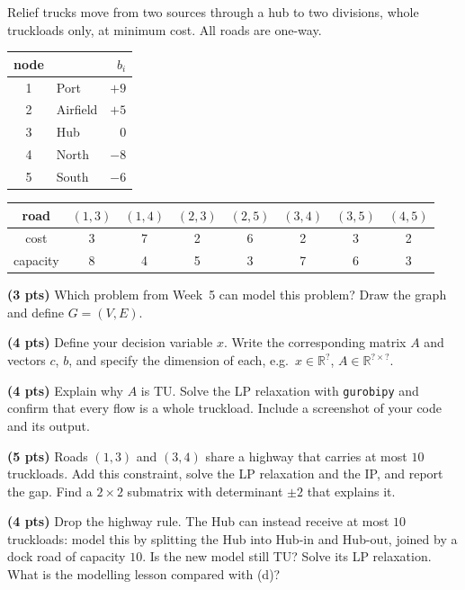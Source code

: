 \documentclass[10pt]{article}
\begin{document}
Relief trucks move from two sources through a hub to two divisions, whole truckloads
only, at minimum cost. All roads are one-way.
\begin{center}
\begin{tabular}[t]{c|l|r}
 node & & $b_i$ \\ \hline
 1 & Port     & $+9$ \\
 2 & Airfield & $+5$ \\
 3 & Hub      & $0$ \\
 4 & North    & $-8$ \\
 5 & South    & $-6$ \\
\end{tabular}
\qquad
\begin{tabular}[t]{c|ccccccc}
 road      & $(1,3)$ & $(1,4)$ & $(2,3)$ & $(2,5)$ & $(3,4)$ & $(3,5)$ & $(4,5)$ \\ \hline
 cost      & 3 & 7 & 2 & 6 & 2 & 3 & 2 \\
 capacity  & 8 & 4 & 5 & 3 & 7 & 6 & 3 \\
\end{tabular}
\end{center}

\begin{parts}
\item \textbf{(3 pts)} Which problem from Week~5 can model this problem? Draw the graph
  and define $G = (V, E)$.
\item \textbf{(4 pts)} Define your decision variable $x$. Write the corresponding matrix
  $A$ and vectors $c$, $b$, and specify the dimension of each, e.g.\
  $x \in \mathbb{R}^{?}$, $A \in \mathbb{R}^{? \times ?}$.
\item \textbf{(4 pts)} Explain why $A$ is TU. Solve the LP relaxation with
  \texttt{gurobipy} and confirm that every flow is a whole truckload. Include a
  screenshot of your code and its output.
\item \textbf{(5 pts)} Roads $(1,3)$ and $(3,4)$ share a highway that carries at most
  $10$ truckloads. Add this constraint, solve the LP relaxation and the IP, and report
  the gap. Find a $2 \times 2$ submatrix with determinant $\pm 2$ that explains it.
\item \textbf{(4 pts)} Drop the highway rule. The Hub can instead receive at most $10$
  truckloads: model this by splitting the Hub into Hub-in and Hub-out, joined by a dock
  road of capacity $10$. Is the new model still TU? Solve its LP relaxation. What is the
  modelling lesson compared with (d)?
\end{parts}
\end{document}
